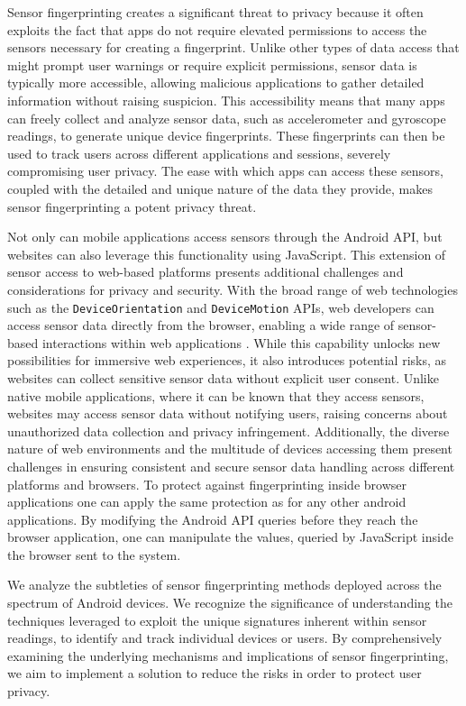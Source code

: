 \documentclass[11pt,
  oneside,openany,    %
]{scrreprt}
\begin{document}
Sensor fingerprinting creates a significant threat to privacy because it often exploits the fact that apps do not require elevated permissions to access the sensors necessary for creating a fingerprint.
Unlike other types of data access that might prompt user warnings or require explicit permissions, sensor data is typically more accessible, allowing malicious applications to gather detailed information without raising suspicion. 
This accessibility means that many apps can freely collect and analyze sensor data, such as accelerometer and gyroscope readings, to generate unique device fingerprints.
These fingerprints can then be used to track users across different applications and sessions, severely compromising user privacy.
The ease with which apps can access these sensors, coupled with the detailed and unique nature of the data they provide, makes sensor fingerprinting a potent privacy threat.

Not only can mobile applications access sensors through the Android API, but websites can also leverage this functionality using JavaScript.
This extension of sensor access to web-based platforms presents additional challenges and considerations for privacy and security.
With the broad range of web technologies such as the \verb|DeviceOrientation| and \verb|DeviceMotion| APIs, web developers can access sensor data directly from the browser, enabling a wide range of sensor-based interactions within web applications \cite{das2018every}.
While this capability unlocks new possibilities for immersive web experiences, it also introduces potential risks, as websites can collect sensitive sensor data without explicit user consent.
Unlike native mobile applications, where it can be known that they access sensors, websites may access sensor data without notifying users, raising concerns about unauthorized data collection and privacy infringement.
Additionally, the diverse nature of web environments and the multitude of devices accessing them present challenges in ensuring consistent and secure sensor data handling across different platforms and browsers.
To protect against fingerprinting inside browser applications one can apply the same protection as for any other android applications.
By modifying the Android API queries before they reach the browser application, one can manipulate the values, queried by JavaScript inside the browser sent to the system.

We analyze the subtleties of sensor fingerprinting methods deployed across the spectrum of Android devices. 
We recognize the significance of understanding the techniques leveraged to exploit the unique signatures inherent within sensor readings, to identify and track individual devices or users. 
By comprehensively examining the underlying mechanisms and implications of sensor fingerprinting, we aim to implement a solution to reduce the risks in order to protect user privacy.
\end{document}
